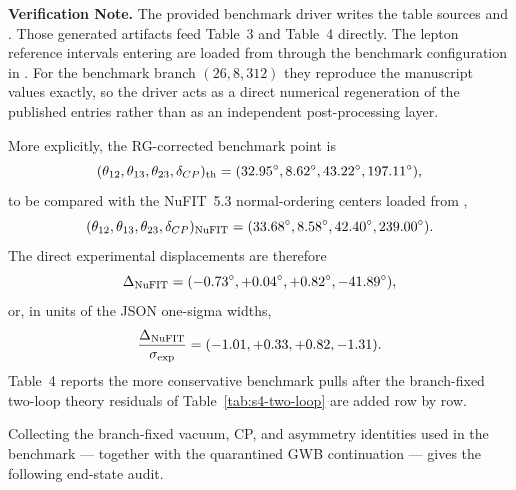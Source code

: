 \documentclass[11pt]{article}
\begin{document}
\medskip
\noindent\textbf{Verification Note.}
The provided benchmark driver writes the table sources
 and
. Those generated artifacts feed
Table~3 and Table~4 directly. The lepton reference intervals entering
 are loaded from
 through the benchmark configuration in
. For the benchmark branch $(26,8,312)$ they
reproduce the manuscript values exactly, so the driver acts as a direct
numerical regeneration of the published entries rather than as an independent
post-processing layer.

More explicitly, the RG-corrected benchmark point is
\begin{equation}
 (\theta_{12},\theta_{13},\theta_{23},\delta_{CP})_{\rm th}
 =
 (32.95^{\circ},8.62^{\circ},43.22^{\circ},197.11^{\circ}),
\end{equation}
to be compared with the NuFIT~5.3 normal-ordering centers loaded from
,
\begin{equation}
 (\theta_{12},\theta_{13},\theta_{23},\delta_{CP})_{\rm NuFIT}
 =
 (33.68^{\circ},8.58^{\circ},42.40^{\circ},239.00^{\circ}).
\end{equation}
The direct experimental displacements are therefore
\begin{equation}
 \Delta_{\rm NuFIT}
 =
 (-0.73^{\circ},+0.04^{\circ},+0.82^{\circ},-41.89^{\circ}),
\end{equation}
or, in units of the JSON one-sigma widths,
\begin{equation}
 \frac{\Delta_{\rm NuFIT}}{\sigma_{\rm exp}}
 =
 (-1.01,+0.33,+0.82,-1.31).
\end{equation}
Table~4 reports the more conservative benchmark pulls after the branch-fixed two-loop theory residuals of Table~\ref{tab:s4-two-loop} are added row by row.

Collecting the branch-fixed vacuum, CP, and asymmetry identities used in the
benchmark --- together with the quarantined GWB continuation --- gives the
following end-state audit.
\end{document}
